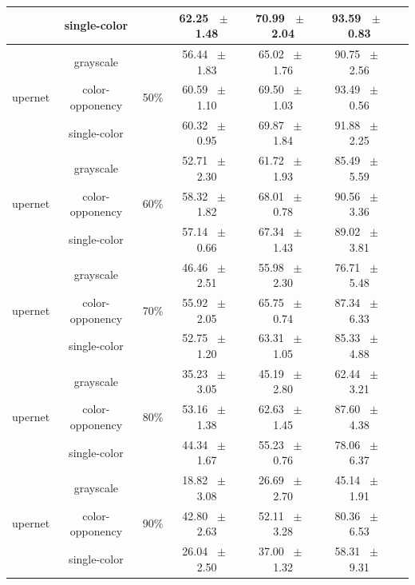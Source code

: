 \begin{table}[h]
\begin{tabular}{@{}lccc ccc@{}}
    & single-color &  & 62.25 ~$\pm$~ 1.48 & 70.99 ~$\pm$~ 2.04 & 93.59 ~$\pm$~ 0.83 \\
    \midrule
    \multirow{3}{*}{upernet} & grayscale & \multirow{3}{*}{50\%} & 56.44 ~$\pm$~ 1.83 & 65.02 ~$\pm$~ 1.76 & 90.75 ~$\pm$~ 2.56 \\
    & color-opponency &  & 60.59 ~$\pm$~ 1.10 & 69.50 ~$\pm$~ 1.03 & 93.49 ~$\pm$~ 0.56 \\
    & single-color &  & 60.32 ~$\pm$~ 0.95 & 69.87 ~$\pm$~ 1.84 & 91.88 ~$\pm$~ 2.25 \\
    \midrule
    \multirow{3}{*}{upernet} & grayscale & \multirow{3}{*}{60\%} & 52.71 ~$\pm$~ 2.30 & 61.72 ~$\pm$~ 1.93 & 85.49 ~$\pm$~ 5.59 \\
    & color-opponency &  & 58.32 ~$\pm$~ 1.82 & 68.01 ~$\pm$~ 0.78 & 90.56 ~$\pm$~ 3.36 \\
    & single-color &  & 57.14 ~$\pm$~ 0.66 & 67.34 ~$\pm$~ 1.43 & 89.02 ~$\pm$~ 3.81 \\
    \midrule
    \multirow{3}{*}{upernet} & grayscale & \multirow{3}{*}{70\%} & 46.46 ~$\pm$~ 2.51 & 55.98 ~$\pm$~ 2.30 & 76.71 ~$\pm$~ 5.48 \\
    & color-opponency &  & 55.92 ~$\pm$~ 2.05 & 65.75 ~$\pm$~ 0.74 & 87.34 ~$\pm$~ 6.33 \\
    & single-color &  & 52.75 ~$\pm$~ 1.20 & 63.31 ~$\pm$~ 1.05 & 85.33 ~$\pm$~ 4.88 \\
    \midrule
    \multirow{3}{*}{upernet} & grayscale & \multirow{3}{*}{80\%} & 35.23 ~$\pm$~ 3.05 & 45.19 ~$\pm$~ 2.80 & 62.44 ~$\pm$~ 3.21 \\
    & color-opponency &  & 53.16 ~$\pm$~ 1.38 & 62.63 ~$\pm$~ 1.45 & 87.60 ~$\pm$~ 4.38 \\
    & single-color &  & 44.34 ~$\pm$~ 1.67 & 55.23 ~$\pm$~ 0.76 & 78.06 ~$\pm$~ 6.37 \\
    \midrule
    \multirow{3}{*}{upernet} & grayscale & \multirow{3}{*}{90\%} & 18.82 ~$\pm$~ 3.08 & 26.69 ~$\pm$~ 2.70 & 45.14 ~$\pm$~ 1.91 \\
    & color-opponency &  & 42.80 ~$\pm$~ 2.63 & 52.11 ~$\pm$~ 3.28 & 80.36 ~$\pm$~ 6.53 \\
    & single-color &  & 26.04 ~$\pm$~ 2.50 & 37.00 ~$\pm$~ 1.32 & 58.31 ~$\pm$~ 9.31 \\
    \midrule
    \bottomrule
  \end{tabular}
  \label{tab:sparse_results_upernet_cityscapes}
\end{table}